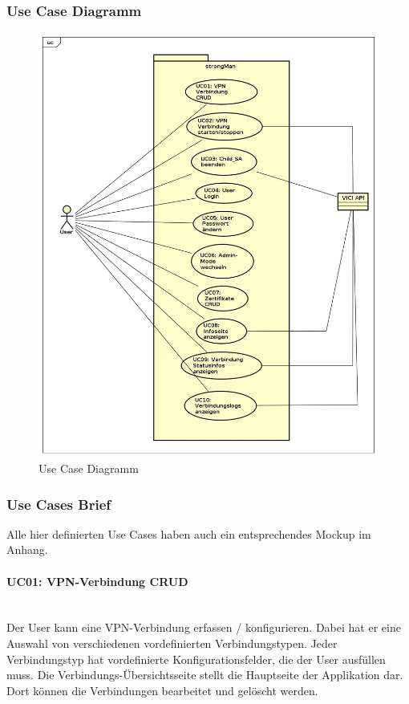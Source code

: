 \subsubsection{Use Case Diagramm}
\begin{figure}[H]
\centering
\includegraphics[width=370pt]{images/usecases.jpg}
\caption[Use Case Diagramm]{Use Case Diagramm}
\end{figure}


\subsubsection{Use Cases Brief}
Alle hier definierten Use Cases haben auch ein entsprechendes Mockup im Anhang.
\paragraph{UC01: VPN-Verbindung CRUD}\mbox{} \\
Der User kann eine VPN-Verbindung erfassen / konfigurieren. Dabei hat er eine Auswahl von verschiedenen vordefinierten Verbindungstypen. Jeder Verbindungstyp hat vordefinierte Konfigurationsfelder, die der User ausfüllen muss. Die Verbindungs-Übersichtsseite stellt die Hauptseite der Applikation dar. Dort können die Verbindungen bearbeitet und gelöscht werden.

